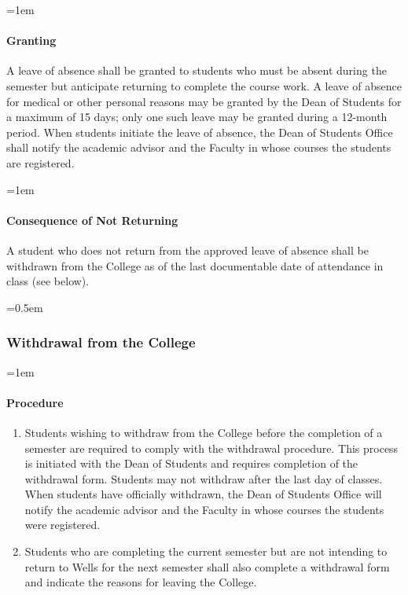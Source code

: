 \documentclass{manual}
\let\oldsubsubsection\subsubsection
\renewcommand\subsubsection{\leftskip=0.5em\oldsubsubsection}
\let\oldparagraph\paragraph
\renewcommand\paragraph{\leftskip=1em\oldparagraph}
\begin{document}
\paragraph{Granting} 

A leave of absence shall be granted to students who must be absent during the semester but anticipate returning to complete the course work. A leave of absence for medical or other personal reasons may be granted by the Dean of Students for a maximum of 15 days; only one such leave may be granted during a 12-month period. When students initiate the leave of absence, the Dean of Students Office shall notify the academic advisor and the Faculty in whose courses the students are registered.

\paragraph{Consequence of Not Returning}

A student who does not return from the approved leave of absence shall be withdrawn from the College as of the last documentable date of attendance in class (see below).




\subsubsection{Withdrawal from the College}\label{sub:WithdrawlFromTheCollege}

\paragraph{Procedure}
\begin{enumerate}[label=\alph*)]
\item Students wishing to withdraw from the College before the completion of a semester are required to comply with the withdrawal procedure. This process is initiated with the Dean of Students and requires completion of the withdrawal form. Students may not withdraw after the last day of classes. When students have officially withdrawn, the Dean of Students Office will notify the academic advisor and the Faculty in whose courses the students were registered.

\item Students who are completing the current semester but are not intending to return to Wells for the next semester shall also complete a withdrawal form and indicate the reasons for leaving the College.
\end{enumerate}
\end{document}
